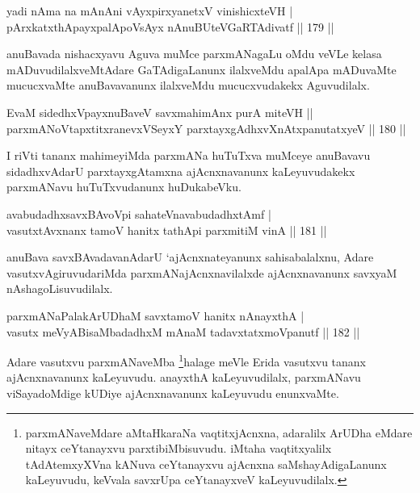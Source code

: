 \begin{shl}
yadi nAma na mAnAni vAyxpirxyanetxV vinishicxteVH | \\
pArxkatxthA\s payxpalApoV\s sAyx nAnuBUteVGaRTAdivatf \hfill||  179 ||  
\end{shl}

\begin{artha}
anuBavada nishacxyavu Aguva muMce parxmANagaLu oMdu veVLe kelasa mADuvudilalxveMtAdare GaTAdigaLanunx ilalxveMdu apalApa mADuvaMte mucucxvaMte anuBavavanunx ilalxveMdu mucucxvudakekx Aguvudilalx.
\end{artha}

\begin{shl}
EvaM sidedhxV\s payxnuBaveV savxmahimAnx purA miteVH ||  \\
parxmANoVtapxtitxranevxVSeyxY parxtayxgAdhxvXnAtxpanutatxyeV \hfill||  180 ||  
\end{shl}

\begin{artha}
I riVti tananx mahimeyiMda parxmANa huTuTxva muMceye anuBavavu sidadhxvAdarU parxtayxgAtamxna ajAcnxnavanunx kaLeyuvudakekx parxmANavu huTuTxvudanunx huDukabeVku.
\end{artha}


\begin{shl}
avabudadhxsavxBAvoV\s pi sahateV\s navabudadhxtAmf | \\
vasutxtAvxnanx tamoV hanitx tathA\s pi parxmitiM vinA \hfill||  181 ||  
\end{shl}

\begin{artha}
anuBava savxBAvadavanAdarU `ajAcnxnateyanunx sahisabalalxnu, Adare vasutxvAgiruvudariMda parxmANajAcnxnavilalxde ajAcnxnavanunx savxyaM nAshagoLisuvudilalx.
\end{artha}

\begin{shl}
parxmANaPalakArUDhaM savxtamoV hanitx nAnayxthA | \\
vasutx meVyABisaMbadadhxM mAnaM tadavxtatxmoVpanutf \hfill||  182 ||  
\end{shl}

\begin{artha}
Adare vasutxvu parxmANaveMba \footnote{parxmANaveMdare aMtaHkaraNa vaqtitxjAcnxna, adaralilx ArUDha eMdare nitayx ceYtanayxvu parxtibiMbisuvudu. iMtaha vaqtitxyalilx tAdAtemxyXVna kANuva ceYtanayxvu ajAcnxna saMshayAdigaLanunx kaLeyuvudu, keVvala savxrUpa ceYtanayxveV kaLeyuvudilalx.}halage meVle Erida vasutxvu tananx ajAcnxnavanunx kaLeyuvudu. anayxthA kaLeyuvudilalx, parxmANavu viSayadoMdige kUDiye ajAcnxnavanunx kaLeyuvudu enunxvaMte.
\end{artha}


